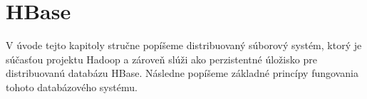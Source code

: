 \documentclass[11pt,twoside,a4paper]{book}
\begin{document}
% 
% 
% 
% 
% 
% 
% 
% 
% 
% 
% 
% 
% 
% 

\chapter{HBase}
V úvode tejto kapitoly stručne popíšeme distribuovaný súborový systém, ktorý je súčasťou projektu Hadoop a zároveň slúži ako perzistentné úložisko pre distribuovanú databázu HBase. Následne popíšeme základné princípy fungovania tohoto databázového systému.
\end{document}
